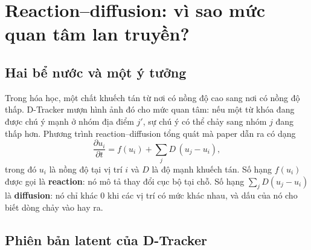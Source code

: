 \section{Reaction--diffusion: vì sao mức quan tâm lan truyền?}
\label{sec:reaction-diffusion}

\subsection{Hai bể nước và một ý tưởng}

Trong hóa học, một chất khuếch tán từ nơi có nồng độ cao sang nơi có nồng độ thấp. D-Tracker
mượn hình ảnh đó cho mức quan tâm: nếu một từ khóa đang được chú ý mạnh ở nhóm địa điểm $j'$,
sự chú ý có thể chảy sang nhóm $j$ đang thấp hơn. Phương trình reaction--diffusion tổng quát mà
paper dẫn ra có dạng
\begin{equation}
  \frac{\partial u_i}{\partial t}
  =f(u_i)+\sum_j D\,(u_j-u_i),
  \label{eq:rd-background}
\end{equation}
trong đó $u_i$ là nồng độ tại vị trí $i$ và $D$ là độ mạnh khuếch tán. Số hạng $f(u_i)$ được gọi
là \textbf{reaction}: nó mô tả thay đổi cục bộ tại chỗ. Số hạng $\sum_j D(u_j-u_i)$ là
\textbf{diffusion}: nó chỉ khác 0 khi các vị trí có mức khác nhau, và dấu của nó cho biết dòng
chảy vào hay ra.

\begin{center}
\end{center}

\subsection{Phiên bản latent của D-Tracker}

